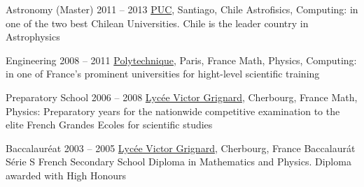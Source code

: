 



\begin{coordinatelist}
\end{coordinatelist}




\begin{yearlist}[7.1][0.7][3.5]

\item[Astronomy (Master)]{2011 -- 2013}
	{
	\href{http://www.uc.cl/}{PUC}, Santiago, Chile
	}
    {Astrofisics, Computing: in one of the two best Chilean Universities. 
    Chile is the leader country in Astrophysics}
    

\item[Engineering]{2008 -- 2011}
	{
	\href{https://www.polytechnique.edu/}{Polytechnique}, Paris, France
	}
    {Math, Physics, Computing: in one of France's prominent universities for hight-­level scientific training}


\item[Preparatory School]{2006 -- 2008}
	{
	\href{http://www.lycee-grignard.fr/}{Lyc\'ee Victor Grignard}, Cherbourg, France
	}
	{Math, Physics: Preparatory years for the nationwide competitive examination to the elite French Grandes Ecoles for scientific studies}


\item[Baccalaur\'eat]{2003 -- 2005}
	{
	\href{http://www.lycee-grignard.fr/}{Lyc\'ee Victor Grignard}, Cherbourg, France
	}
	{Baccalaur\'at S\'erie S French Secon\-da\-ry School Diploma in Mathematics and Physics. 
    Diploma awarded with High Honours}
    
\end{yearlist}


